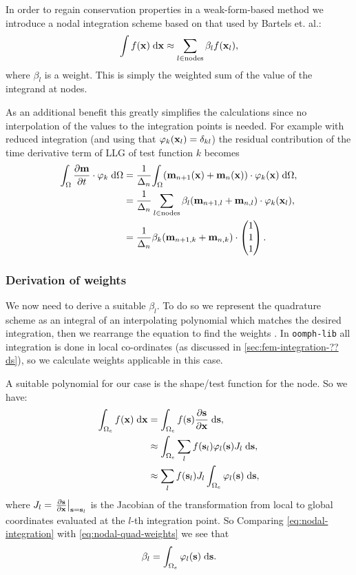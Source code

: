 In order to regain conservation properties in a weak-form-based method we introduce a nodal integration scheme based on that used by Bartels et. al.\cite{Bartels2006}:
\begin{equation}
  \label{eq:nodal-integration}
  \int f(\mathbf{x}) {\; \text{d}} \mathbf{x} \approx \sum_{l\in \text{nodes}} \beta_l f(\mathbf{x}_l),
\end{equation}
where $\beta_l$ is a weight.
This is simply the weighted sum of the value of the integrand at nodes.

As an additional benefit this greatly simplifies the calculations since no interpolation of the values to the integration points is needed.
For example with reduced integration (and using that $\varphi_k(\mathbf{x}_l) = \delta_{kl}$) the residual contribution of the time derivative term of LLG of test function $k$ becomes
\begin{equation}
  \begin{aligned}
    {\int_{\Omega} \frac{\partial \mathbf{m}}{\partial t}\cdot \mathbf{\varphi}_k {\; \text{d}}{\Omega}} &= \frac{1}{\Delta_{n}} {\int_{\Omega} (\mathbf{m}_{n+1}(\mathbf{x}) + \mathbf{m}_{n}(\mathbf{x})) \cdot \mathbf{\varphi}_k(\mathbf{x}) {\; \text{d}} {\Omega}}, \\
    & = \frac{1}{\Delta_{n}} \sum_{l\in \text{nodes}} \beta_l (\mathbf{m}_{n+1, l} + \mathbf{m}_{n, l}) \cdot \mathbf{\varphi}_k(\mathbf{x}_l), \\
    & = \frac{1}{\Delta_{n}} \beta_k (\mathbf{m}_{n+1, k} + \mathbf{m}_{n, k}) \cdot \begin{pmatrix} 1 \\ 1 \\ 1 \end{pmatrix}.
  \end{aligned}
\end{equation}


\subsubsection{Derivation of weights}

We now need to derive a suitable $\beta_l$.
To do so we represent the quadrature scheme as an integral of an interpolating polynomial which matches the desired integration, then we rearrange the equation to find the weights \cite[pg. 480]{Kincaid2002}.
In \texttt{oomph-lib} all integration is done in local co-ordinates (as discussed in \autoref{sec:fem-integration-??ds}), so we calculate weights applicable in this case.

A suitable polynomial for our case is the shape/test function for the node.
So we have:
\begin{equation}
\label{eq:nodal-quad-weights}
  \begin{aligned}
    \int_{\Omega_e} f(\mathbf{x}) {\; \text{d}} \mathbf{x} &= \int_{\Omega_e} f({\mathbf{s}}) \frac{\partial {\mathbf{s}}}{\partial \mathbf{x}} {\; \text{d}} {\mathbf{s}}, \\
    &\approx \int_{\Omega_e} \sum_l f({\mathbf{s}}_l) \varphi_l({\mathbf{s}}) J_l {\; \text{d}} {\mathbf{s}}, \\
    &\approx  \sum_l f({\mathbf{s}}_l) J_l \int_{\Omega_e} \varphi_l({\mathbf{s}})  {\; \text{d}} {\mathbf{s}},
  \end{aligned} 
\end{equation}
where $J_l =  {\left. \frac{\partial {\mathbf{s}}}{\partial \mathbf{x}} \right|}_{{\mathbf{s}}={\mathbf{s}}_l}$ is the Jacobian of the transformation from local to global coordinates evaluated at the $l$-th integration point.
So 
Comparing \eqref{eq:nodal-integration} with \eqref{eq:nodal-quad-weights} we see that
\begin{equation}
  \beta_l =  \int_{\Omega_e} \varphi_l({\mathbf{s}})  {\; \text{d}} {\mathbf{s}}.
\end{equation}

